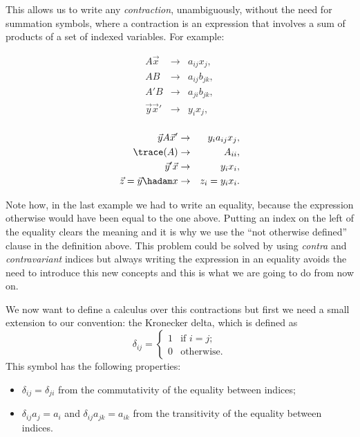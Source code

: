 \documentclass{article}
\begin{document}
This allows us to write any \emph{contraction}, unambiguously, without the need
for summation symbols, where a contraction is an expression that involves a sum
of products of a set of indexed variables. For example:

\noindent
\begin{minipage}{.5\textwidth}
\begin{eqnarray*}
A \vec x &\rightarrow& a_{ij} x_j, \\
A B &\rightarrow& a_{ij} b_{jk}, \\
A' B &\rightarrow& a_{ji} b_{jk}, \\
\vec y \vec x' &\rightarrow& y_i x_j,\\
\end{eqnarray*}
\end{minipage}
\begin{minipage}{.5\textwidth}
\begin{eqnarray*}
\vec y A \vec x' &\rightarrow& y_i a_{ij} x_j, \\
\trace(A) &\rightarrow& A_{ii}, \\
\vec y' \vec x &\rightarrow& y_i x_i, \\
\vec z = \vec y \hadam x &\rightarrow& z_i = y_i x_i.\\
\end{eqnarray*}
\end{minipage}

Note how, in the last example we had to write an equality, because the
expression otherwise would have been equal to the one above. Putting an index on
the left of the equality clears the meaning and it is why we use
the ``not otherwise defined'' clause in the definition above. This problem could
be solved by using \emph{contra} and \emph{contravariant} indices but always
writing the expression in an equality avoids the need to introduce this new
concepts and this is what we are going to do from now on.

We now want to define a calculus over this contractions but first we need a
small extension to our convention: the Kronecker delta, which is defined as
\[
\delta_{ij} = \left\{\begin{array}{ll}
                     1 & \mbox{if \(i = j\)}; \\
                     0 & \mbox{otherwise}.
                     \end{array}\right.
\] This symbol has the following properties:
\begin{itemize}
\item \(\delta_{ij} = \delta_{ji}\) from the commutativity of the equality
between indices;
\item \(\delta_{ij} a_j = a_i\) and \(\delta_{ij} a_{jk} = a_{ik}\) from the
transitivity of the equality between indices.
\end{itemize}
\end{document}
